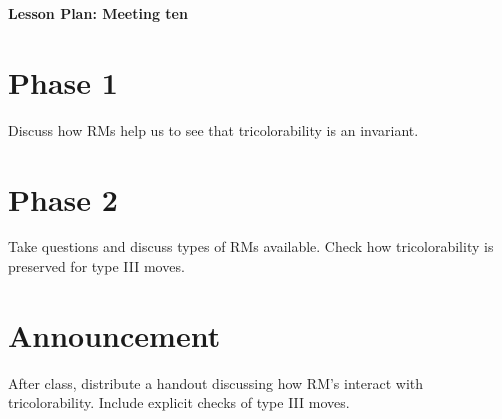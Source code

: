 \documentclass[12pt]{amsart}
\theoremstyle{definition}
\begin{document}
\begin{center}
\textbf{\Huge
Lesson Plan: Meeting ten
}
\end{center}
\vspace{.5in}

\section*{Phase 1}
Discuss how RMs help us to see that tricolorability is an invariant.

\section*{Phase 2}
Take questions and discuss types of RMs available. 
Check how tricolorability is preserved for type III moves.

\section{Announcement}
After class, distribute a handout discussing how RM's interact with tricolorability.
Include explicit checks of type III moves.
\end{document}
